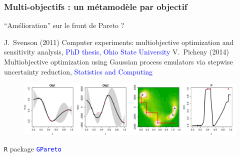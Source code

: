 \begin{frame}
\frametitle{Multi-objectifs : un métamodèle par objectif}
 ``Amélioration'' sur le front de Pareto ?

\scriptsize{
 \begin{thebibliography}{2}
\beamertemplatearticlebibitems
{}
     J.~Svenson (2011)
         \newblock Computer experiments: multiobjective optimization and sensitivity analysis, \textcolor{blue}{PhD thesis, Ohio State University}
     V.~Picheny (2014)
         \newblock Multiobjective optimization using Gaussian process emulators via stepwise uncertainty reduction, \textcolor{blue}{Statistics and Computing}
\end{thebibliography}
}
\begin{figure}[h!]
  \centering
  \includegraphics[trim=0 0 90mm 0, width=.9\paperwidth, clip]{fig/multiPGinitFull.pdf}
\end{figure}

\normalsize
\texttt{R} package \textcolor{blue}{\texttt{GPareto}}
\end{frame}
